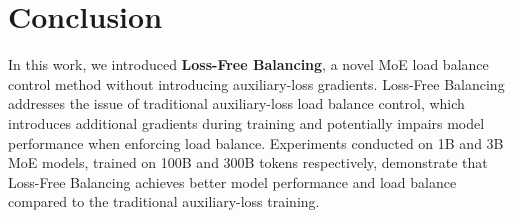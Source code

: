 \documentclass{article} %
\newcommand{\lean}[1]{\textcolor{brown}{\bf \small[#1 - wang]}}{}
\newcommand{\ours}{Loss-Free Balancing}
\newcommand{\Ours}{Loss-Free Balancing}
\begin{document}







\section{Conclusion}
In this work, we introduced \textbf{\ours{}}, a novel MoE load balance control method without introducing auxiliary-loss gradients. \Ours{} addresses the issue of traditional auxiliary-loss load balance control, which introduces additional gradients during training and potentially impairs model performance when enforcing load balance. Experiments conducted on 1B and 3B MoE models, trained on 100B and 300B tokens respectively, demonstrate that \ours{} achieves better model performance and load balance compared to the traditional auxiliary-loss training.






\appendix
\end{document}
